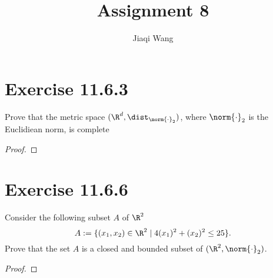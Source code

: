 \documentclass{assignment}
\title{Assignment 8}
\author{Jiaqi Wang}
\begin{document}
    \maketitle

    \section{Exercise 11.6.3}
    \begin{problem}
        Prove that the metric space $(\R^d, \dist_{\norm{\cdot}_2})$, where $\norm{\cdot}_2$ is the Euclidiean norm, is complete
    \end{problem}
    \begin{proof}
    \end{proof}

    \section{Exercise 11.6.6}
    \begin{problem}
        Consider the following subset $A$ of $\R^2$
        $$A := \{(x_1,x_2) \in \R^2 \mid 4(x_1)^2 + (x_2)^2 \le 25\}.$$
        Prove that the set $A$ is a closed and bounded subset of $(\R^2, \norm{\cdot}_2)$.
    \end{problem}
    \begin{proof}
    \end{proof}
\end{document}
